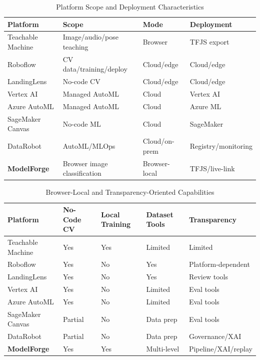 \documentclass[conference]{IEEEtran}
\begin{document}
\begin{table}[t]
\centering
\footnotesize
\caption{Platform Scope and Deployment Characteristics}
\label{tab:platform_scope}
\begin{tabularx}{\textwidth}{@{}p{}X p{} p{}@{}}
\toprule
\textbf{Platform} & \textbf{Scope} & \textbf{Mode} & \textbf{Deployment} \\
\midrule
Teachable Machine \cite{Carney2020} & Image/audio/pose teaching & Browser & TFJS export \\
Roboflow \cite{Roboflow} & CV data/training/deploy & Cloud/edge & Cloud/edge \\
LandingLens \cite{LandingLens} & No-code CV & Cloud/edge & Cloud/edge \\
Vertex AI \cite{VertexAI} & Managed AutoML & Cloud & Vertex AI \\
Azure AutoML \cite{AzureAutoML} & Managed AutoML & Cloud & Azure ML \\
SageMaker Canvas \cite{SageMakerCanvas} & No-code ML & Cloud & SageMaker \\
DataRobot \cite{DataRobot} & AutoML/MLOps & Cloud/on-prem & Registry/monitoring \\
\textbf{ModelForge} & Browser image classification & Browser-local & TFJS/live-link \\
\bottomrule
\end{tabularx}
\end{table}

\begin{table}[t]
\centering
\footnotesize
\caption{Browser-Local and Transparency-Oriented Capabilities}
\label{tab:platform_capabilities}
\begin{tabularx}{\textwidth}{@{}p{}p{}p{}X X@{}}
\toprule
\textbf{Platform} & \textbf{No-Code CV} & \textbf{Local Training} & \textbf{Dataset Tools} & \textbf{Transparency} \\
\midrule
Teachable Machine \cite{Carney2020} & Yes & Yes & Limited & Limited \\
Roboflow \cite{Roboflow} & Yes & No & Yes & Platform-dependent \\
LandingLens \cite{LandingLens} & Yes & No & Yes & Review tools \\
Vertex AI \cite{VertexAI} & Yes & No & Limited & Eval tools \\
Azure AutoML \cite{AzureAutoML} & Yes & No & Limited & Eval tools \\
SageMaker Canvas \cite{SageMakerCanvas} & Partial & No & Data prep & Eval tools \\
DataRobot \cite{DataRobot} & Partial & No & Data prep & Governance/XAI \\
\textbf{ModelForge} & Yes & Yes & Multi-level & Pipeline/XAI/replay \\
\bottomrule
\end{tabularx}
\end{table}
\end{document}
